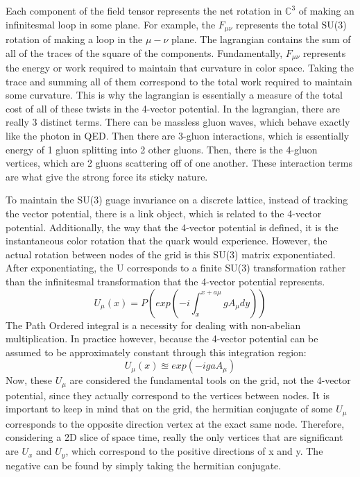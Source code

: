 \documentclass{article}
\begin{document}
Each component of the field tensor represents the net rotation in $\mathbb{C}^3$ of making an infinitesmal loop in some plane. For example, the $F_{\mu \nu}$ represents the total SU(3) rotation of making a loop in the $\mu - \nu$ plane.
The lagrangian contains the sum of all of the traces of the square of the components. Fundamentally, $F_{\mu \nu}$ represents the energy or work required to maintain that curvature in color space. Taking the trace and summing all of them correspond to the total work required to maintain some curvature. 
This is why the lagrangian is essentially a measure of the total cost of all of these twists in the 4-vector potential.
In the lagrangian, there are really 3 distinct terms. There can be massless gluon waves, which behave exactly like the photon in QED. Then there are 3-gluon interactions, which is essentially energy of 1 gluon splitting into 2 other gluons. Then, there is the 4-gluon vertices, which are 2 gluons scattering off of one another. These interaction terms are what give the strong force its sticky nature.

To maintain the SU(3) guage invariance on a discrete lattice, instead of tracking the vector potential, there is a link object, which is related to the 4-vector potential.
Additionally, the way that the 4-vector potential is defined, it is the instantaneous color rotation that the quark would experience. However, the actual rotation between nodes of the grid is this SU(3) matrix exponentiated.
After exponentiating, the U corresponds to a finite SU(3) transformation rather than the infinitesmal transformation that the 4-vector potential represents.
\begin{equation}
    U_{\mu}(x) = P(exp({-i \int_{x}^{x+a\mu}}{g A_{\mu} dy}))
\end{equation}
The Path Ordered integral is a necessity for dealing with non-abelian multiplication.
In practice however, because the 4-vector potential can be assumed to be approximately constant through this integration region: 
\begin{equation}
    U_{\mu}(x) \approxeq exp(-igaA_{\mu})
\end{equation}
Now, these $U_{\mu}$ are considered the fundamental tools on the grid, not the 4-vector potential, since they actually correspond to the vertices between nodes.
It is important to keep in mind that on the grid, the hermitian conjugate of some $U_{\mu}$ corresponds to the opposite direction vertex at the exact same node. 
Therefore, considering a 2D slice of space time, really the only vertices that are significant are $U_x$ and $U_y$, which correspond to the positive directions of x and y. The negative can be found by simply taking the hermitian conjugate.
\end{document}
